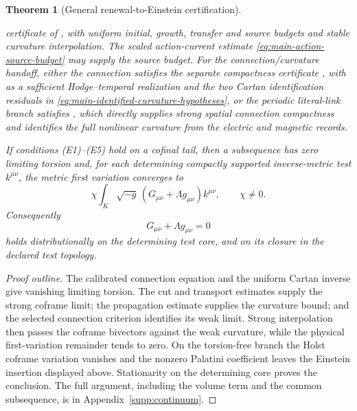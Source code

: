 \documentclass[11pt]{article}
\newtheorem{theorem}{Theorem}[section]
\numberwithin{equation}{section}
\theoremstyle{definition}
\theoremstyle{remark}
\begin{document}
\begin{theorem}[General renewal-to-Einstein certification]
\begin{enumerate}[label=\textup{(E\arabic*)},leftmargin=3em]
      certificate of , with uniform initial,
      growth, transfer and source budgets and stable curvature interpolation.
      The scaled action-current estimate
      \eqref{eq:main-action-source-budget} may supply the source budget.       For the connection/curvature handoff, either the connection satisfies the
       separate compactness certificate ,
       with  as a sufficient Hodge--temporal
       realization and the two Cartan identification residuals in
       \eqref{eq:main-identified-curvature-hypotheses}, or the periodic literal-link
       branch satisfies , which directly
       supplies strong spatial connection compactness and identifies the full
       nonlinear curvature from the electric and magnetic records.
\end{enumerate}
If conditions \textup{(E1)--(E5)} hold on a cofinal tail, then a subsequence
has zero limiting torsion and, for each determining compactly supported
inverse-metric test $k^{\mu\nu}$, the metric first variation converges to
\begin{equation}
 \chi\int_K\sqrt{-g}\,
       (G_{\mu\nu}+\Lambda g_{\mu\nu})k^{\mu\nu},\qquad \chi\ne0.
 \label{eq:main-einstein-variation}
\end{equation}
Consequently
\begin{equation}
 \boxed{G_{\mu\nu}+\Lambda g_{\mu\nu}=0}
 \label{eq:main-vacuum-einstein}
\end{equation}
holds distributionally on the determining test core, and on its closure in
the declared test topology.
\end{theorem}
\begin{proof}[Proof outline]
The calibrated connection equation and the uniform Cartan inverse give
vanishing limiting torsion. The cut and transport estimates supply the
strong coframe limit; the propagation estimate supplies the curvature bound;
and the selected connection criterion identifies its weak limit.
Strong interpolation then passes the coframe bivectors against the weak
curvature, while the physical first-variation remainder tends to zero.
On the torsion-free branch the Holst coframe variation vanishes and the
nonzero Palatini coefficient leaves the Einstein insertion displayed above.
Stationarity on the determining core proves the conclusion.
The full argument, including the volume term and the common subsequence,
is  in
Appendix~\ref{supp:continuum}.
\end{proof}
\end{document}
